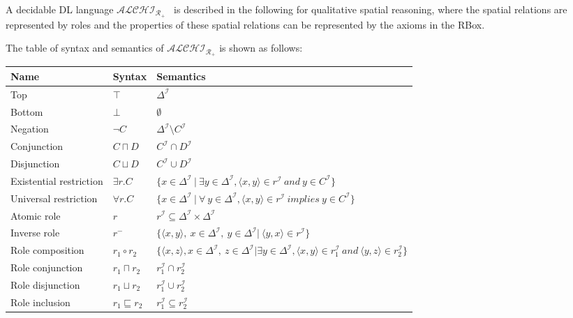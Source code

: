 \documentclass{article}
\begin{document}
A decidable DL language $\mathcal{ALCHI_{R_+}}$~\cite{horrocks1999description} is described in the following for qualitative spatial reasoning, where the spatial relations are 
represented by roles and the properties of these spatial relations can be represented by the axioms in the RBox.

The table of syntax and semantics of $\mathcal{ALCHI_{R_+}}$ is shown as follows:
 \begin{center}
 \begin{table}[H]
    \begin{tabular}{|p{4cm} | p{2cm} | p{10cm}| }
    \hline
      Name & Syntax & Semantics \\ \hline
    Top & $\top$ & $\Delta^\mathcal{I}$ \\
    Bottom & $\bot$ & $\emptyset$ \\ 
    Negation & $\neg C$ & $\Delta^\mathcal{I}\setminus C^\mathcal{I}$ \\ 
    Conjunction & $C\sqcap D$ & $C^\mathcal{I}\cap D^\mathcal{I}$  \\  
    Disjunction & $C\sqcup D$ &  $C^\mathcal{I}\cup D^\mathcal{I}$ \\  
    Existential restriction & $\exists r.C$ & $\{x\in \Delta^\mathcal{I}~|~ \exists y\in \Delta^\mathcal{I}, \langle x,y\rangle \in r^\mathcal{I}~and~y\in C^\mathcal{I}\}$ \\ 
    Universal restriction & $\forall r.C$ & $\{x\in \Delta^\mathcal{I}~|~ \forall~y\in \Delta^\mathcal{I}, \langle x,y\rangle \in r^\mathcal{I}~implies~y\in C^\mathcal{I}\}$ \\ \hline
    Atomic role & $r$ & $r^\mathcal{I}\subseteq \Delta^\mathcal{I} \times \Delta^\mathcal{I}$\\
    Inverse role & $r^-$ & $\{\langle x,y \rangle,~x\in \Delta^\mathcal{I},~y\in \Delta^\mathcal{I} | ~\langle y,x \rangle\in r^\mathcal{I}\}$\\ 
    Role composition & $r_1\circ r_2$ & $\{\langle x,z\rangle, x\in \Delta^\mathcal{I},~z\in \Delta^\mathcal{I}| \exists y\in \Delta^\mathcal{I},\langle x,y \rangle\in r_1^\mathcal{I}~and~\langle y,z\rangle\in r_2^\mathcal{I}\}$\\
    Role conjunction & $r_1\sqcap r_2$ & $r_1^\mathcal{I} \cap r_2^\mathcal{I}$ \\
    Role disjunction & $r_1\sqcup r_2$ & $r_1^\mathcal{I} \cup r_2^\mathcal{I}$ \\
    Role inclusion & $r_1\sqsubseteq r_2$ &  $r_1^\mathcal{I} \subseteq r_2^\mathcal{I}$\\

\end{tabular}
\end{table}
\end{center}
\end{document}

